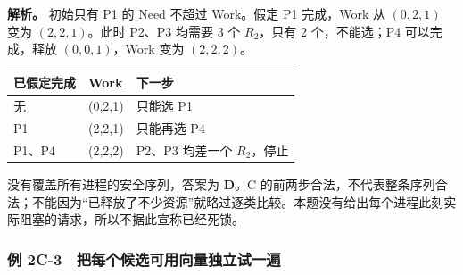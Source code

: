 \textbf{解析。} 初始只有 P1 的 Need 不超过 Work。假定 P1 完成，Work 从 \((0,2,1)\) 变为 \((2,2,1)\)。此时 P2、P3 均需要 3 个 \(R_2\)，只有 2 个，不能选；P4 可以完成，释放 \((0,0,1)\)，Work 变为 \((2,2,2)\)。

\begin{wideblock}

\par\medskip\noindent\begin{minipage}{\linewidth}\fontsize{9.3}{12}\selectfont\begin{tabularx}{\linewidth}{@{}YYY@{}}
\toprule\noalign{}
已假定完成 & Work & 下一步 \\
\midrule\noalign{}


无 & (0,2,1) & 只能选 P1 \\
P1 & (2,2,1) & 只能再选 P4 \\
P1、P4 & (2,2,2) & P2、P3 均差一个 \(R_2\)，停止 \\
\bottomrule\end{tabularx}
\end{minipage}\par\medskip

\end{wideblock}

没有覆盖所有进程的安全序列，答案为 \textbf{D}。C 的前两步合法，不代表整条序列合法；不能因为``已释放了不少资源''就略过逐类比较。本题没有给出每个进程此刻实际阻塞的请求，所以不据此宣称已经死锁。

\subsubsection{例 2C-3　把每个候选可用向量独立试一遍}\label{OS02-ex4-3}

